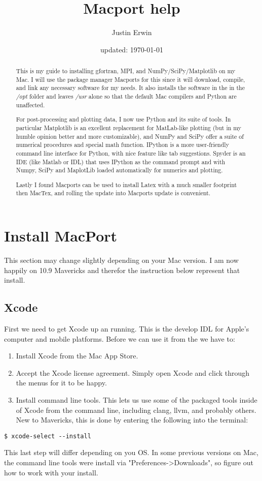 \documentclass[11pt]{article}
\title{Macport help}
\author{Justin Erwin}
\date{updated: \today}
\begin{document}
\maketitle

\begin{abstract}
This is my guide to installing gfortran, MPI,  and NumPy/SciPy/Matplotlib on my Mac. I will use the package manager Macports for this since it will download, compile, and link any necessary software for my needs. It also installs the software in the in the \textit{/opt} folder and leaves \textit{/usr} alone so that the default Mac compilers and Python are unaffected.

For post-processing and plotting data, I now use Python and its suite of tools.  In particular Matplotlib is an excellent replacement for MatLab-like plotting (but in my humble opinion better and more customizable), and NumPy and SciPy offer a suite of numerical procedures and special math function. IPython is a more user-friendly command line interface for Python, with nice feature like tab suggestions. Spyder is an IDE (like Matlab or IDL) that uses IPython as the command prompt and with Numpy, SciPy and MaplotLib loaded automatically for numerics and plotting.

Lastly I found Macports can be used to install Latex with a much smaller footprint then MacTex, and rolling the update into Macports update is convenient. 
\end{abstract}


%
%
%
\tableofcontents


%
%
%
\section{Install MacPort}
This section may change slightly depending on your Mac version. I am now happily on 10.9 Mavericks and therefor the instruction below represent that install. 
\subsection{Xcode}
First we need to get Xcode up an running. This is the develop IDL for Apple's computer and mobile platforms. Before we can use it from the we have to:
\begin{enumerate}
	\item Install Xcode from the Mac App Store.
	\item Accept the Xcode license agreement. Simply open Xcode and click through the menus for it to be happy.
	\item Install command line tools. This lets us use some of the packaged tools inside of Xcode from the command line, including clang, llvm, and probably others. New to Mavericks, this is done by entering the following into the terminal:
\end{enumerate}
\begin{lstlisting}[style=Bash]
$ xcode-select --install
\end{lstlisting}
This last step will differ depending on you OS. In some previous versions on Mac, the command line tools were install via "Preferences->Downloads", so figure out how to work with your install.
\end{document}
